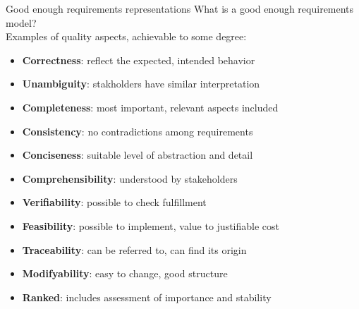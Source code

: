 \documentclass{beamer}
\begin{document}
\begin{frame}[fragile]{Good enough requirements representations}
What is a good enough requirements model?
\\ \vspace*{0.5em}Examples of quality aspects, achievable to some degree:
\begin{itemize}
\item \textbf{Correctness}: reflect the expected, intended behavior
\item \textbf{Unambiguity}: stakholders have similar interpretation
\item \textbf{Completeness}: most important, relevant aspects included
\item \textbf{Consistency}: no contradictions among requirements
\item \textbf{Conciseness}: suitable level of abstraction and detail 
\item \textbf{Comprehensibility}: understood by stakeholders 
\item \textbf{Verifiability}: possible to check fulfillment 
\item \textbf{Feasibility}: possible to implement, value to justifiable cost 
\item \textbf{Traceability}: can be referred to, can find its origin
\item \textbf{Modifyability}: easy to change, good structure
\item \textbf{Ranked}: includes assessment of importance and stability
\end{itemize}
\end{frame}
\end{document}
